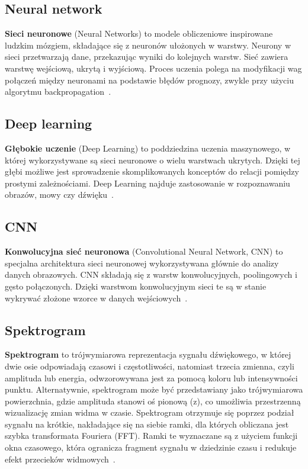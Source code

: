 \documentclass{SGGW-thesis}
\begin{document}
\subsection{Neural network}
\textbf{Sieci neuronowe} (Neural Networks) to modele obliczeniowe inspirowane ludzkim mózgiem, składające się z neuronów ułożonych w warstwy. Neurony w sieci przetwarzają dane, przekazując wyniki do kolejnych warstw. Sieć zawiera warstwę wejściową, ukrytą i wyjściową. Proces uczenia polega na modyfikacji wag połączeń między neuronami na podstawie błędów prognozy, zwykle przy użyciu algorytmu backpropagation~\cite{goodfellow2016deep}.

\subsection{Deep learning}
\textbf{Głębokie uczenie} (Deep Learning) to poddziedzina uczenia maszynowego, w której wykorzystywane są sieci neuronowe o wielu warstwach ukrytych. Dzięki tej głębi możliwe jest sprowadzenie skomplikowanych konceptów do relacji pomiędzy prostymi zależnościami. Deep Learning najduje zastosowanie w rozpoznawaniu obrazów, mowy czy dźwięku~\cite{goodfellow2016deep}.

\subsection{CNN}
\textbf{Konwolucyjna sieć neuronowa} (Convolutional Neural Network, CNN) to specjalna architektura sieci neuronowej wykorzystywana głównie do analizy danych obrazowych. CNN składają się z warstw konwolucyjnych, poolingowych i gęsto połączonych. Dzięki warstwom konwolucyjnym sieci te są w stanie wykrywać złożone wzorce w danych wejściowych~\cite{goodfellow2016deep}.

\subsection{Spektrogram}
\textbf{Spektrogram} to trójwymiarowa reprezentacja sygnału dźwiękowego, w której dwie osie odpowiadają czasowi i częstotliwości, natomiast trzecia zmienna, czyli amplituda lub energia, odwzorowywana jest za pomocą koloru lub intensywności punktu. Alternatywnie, spektrogram może być przedstawiany jako trójwymiarowa powierzchnia, gdzie amplituda stanowi oś pionową (z), co umożliwia przestrzenną wizualizację zmian widma w czasie. Spektrogram otrzymuje się poprzez podział sygnału na krótkie, nakładające się na siebie ramki, dla których obliczana jest szybka transformata Fouriera (FFT). Ramki te wyznaczane są z użyciem funkcji okna czasowego, która ogranicza fragment sygnału w dziedzinie czasu i redukuje efekt przecieków widmowych~\cite{smith1997scientist}.
\end{document}
